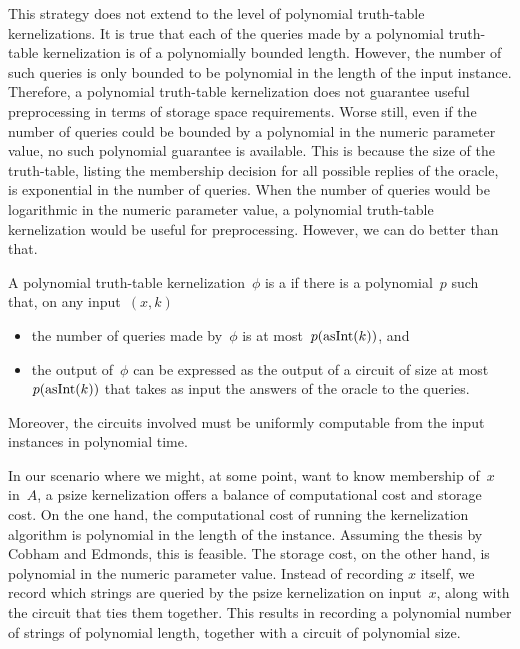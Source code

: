 This strategy does not extend to the level of polynomial truth-table kernelizations.
It is true that each of the queries made by a polynomial truth-table kernelization is of a polynomially bounded length.
However, the number of such queries is only bounded to be polynomial in the length of the input instance.
Therefore, a polynomial truth-table kernelization does not guarantee useful preprocessing in terms of storage space requirements.
Worse still, even if the number of queries could be bounded by a polynomial in the numeric parameter value, no such polynomial guarantee is available.
This is because the size of the truth-table, listing the membership decision for all possible replies of the oracle, is exponential in the number of queries.
When the number of queries would be logarithmic in the numeric parameter value, a polynomial truth-table kernelization would be useful for preprocessing.
However, we can do better than that.
\begin{definition}
  A polynomial truth-table kernelization~$\phi$ is a  if there is a polynomial~$p$ such that, on any input~$(x, k)$
  \begin{itemize}
  \item the number of queries made by~$\phi$ is at most~$p(\operatorname{asInt}(k))$, and
  \item the output of~$\phi$ can be expressed as the output of a circuit of size at most~$p(\operatorname{asInt}(k))$ that takes as input the answers of the oracle to the queries.
  \end{itemize}
  Moreover, the circuits involved must be uniformly computable from the input instances in polynomial time.
\end{definition}

In our scenario where we might, at some point, want to know membership of~$x$ in~$A$, a psize kernelization offers a balance of computational cost and storage cost.
On the one hand, the computational cost of running the kernelization algorithm is polynomial in the length of the instance.
Assuming the thesis by Cobham and Edmonds, this is feasible.
The storage cost, on the other hand, is polynomial in the numeric parameter value.
Instead of recording $x$ itself, we record which strings are queried by the psize kernelization on input~$x$, along with the circuit that ties them together.
This results in recording a polynomial number of strings of polynomial length, together with a circuit of polynomial size.


